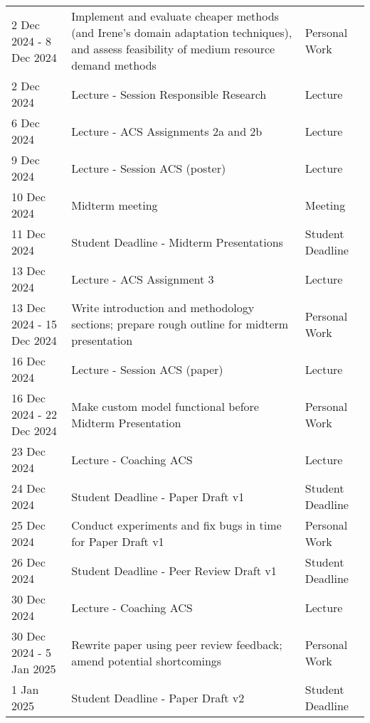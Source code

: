 \documentclass[
]{article}
\begin{document}
\begin{longtable}{p{} p{} p{}}
2 Dec 2024 - 8 Dec 2024 & Implement and evaluate cheaper methods (and Irene's domain adaptation techniques), and assess feasibility of medium resource demand methods & Personal Work \\

2 Dec 2024 & Lecture - Session Responsible Research & Lecture \\

6 Dec 2024 & Lecture - ACS Assignments 2a and 2b & Lecture \\

9 Dec 2024 & Lecture - Session ACS (poster) & Lecture \\

10 Dec 2024 & Midterm meeting & Meeting \\

11 Dec 2024 & Student Deadline - Midterm Presentations & Student Deadline \\

13 Dec 2024 & Lecture - ACS Assignment 3 & Lecture \\

13 Dec 2024 - 15 Dec 2024 & Write introduction and methodology sections; prepare rough outline for midterm presentation & Personal Work \\

16 Dec 2024 & Lecture - Session ACS (paper) & Lecture \\

16 Dec 2024 - 22 Dec 2024 & Make custom model functional before Midterm Presentation & Personal Work \\

23 Dec 2024 & Lecture - Coaching ACS & Lecture \\

24 Dec 2024 & Student Deadline - Paper Draft v1 & Student Deadline \\

25 Dec 2024 & Conduct experiments and fix bugs in time for Paper Draft v1 & Personal Work \\

26 Dec 2024 & Student Deadline - Peer Review Draft v1 & Student Deadline \\

30 Dec 2024 & Lecture - Coaching ACS & Lecture \\

30 Dec 2024 - 5 Jan 2025 & Rewrite paper using peer review feedback; amend potential shortcomings & Personal Work \\

1 Jan 2025 & Student Deadline - Paper Draft v2 & Student Deadline \\


\end{longtable}
\end{document}
